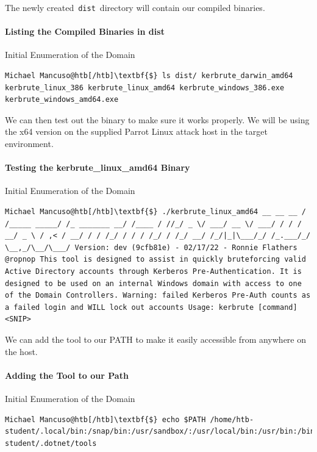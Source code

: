 The newly created \verb|dist| directory will contain our compiled binaries.

\paragraph{Listing the Compiled Binaries in dist}

Initial Enumeration of the Domain

\begin{verbatim}
Michael Mancuso@htb[/htb]\textbf{$} ls dist/ kerbrute_darwin_amd64 kerbrute_linux_386 kerbrute_linux_amd64 kerbrute_windows_386.exe kerbrute_windows_amd64.exe 
\end{verbatim}

We can then test out the binary to make sure it works properly. We will be using the x64 version on the supplied Parrot Linux attack host in the target environment.

\paragraph{Testing the kerbrute\_linux\_amd64 Binary}

Initial Enumeration of the Domain

\begin{verbatim}
Michael Mancuso@htb[/htb]\textbf{$} ./kerbrute_linux_amd64 __ __ __ / /_____ _____/ /_ _______ __/ /____ / //_/ _ \/ ___/ __ \/ ___/ / / / __/ _ \ / ,< / __/ / / /_/ / / / /_/ / /_/ __/ /_/|_|\___/_/ /_.___/_/ \__,_/\__/\___/ Version: dev (9cfb81e) - 02/17/22 - Ronnie Flathers @ropnop This tool is designed to assist in quickly bruteforcing valid Active Directory accounts through Kerberos Pre-Authentication. It is designed to be used on an internal Windows domain with access to one of the Domain Controllers. Warning: failed Kerberos Pre-Auth counts as a failed login and WILL lock out accounts Usage: kerbrute [command] <SNIP> 
\end{verbatim}

We can add the tool to our PATH to make it easily accessible from anywhere on the host.

\paragraph{Adding the Tool to our Path}

Initial Enumeration of the Domain

\begin{verbatim}
Michael Mancuso@htb[/htb]\textbf{$} echo $PATH /home/htb-student/.local/bin:/snap/bin:/usr/sandbox/:/usr/local/bin:/usr/bin:/bin:/usr/local/games:/usr/games:/usr/share/games:/usr/local/sbin:/usr/sbin:/sbin:/snap/bin:/usr/local/sbin:/usr/sbin:/sbin:/usr/local/bin:/usr/bin:/bin:/usr/local/games:/usr/games:/home/htb-student/.dotnet/tools 
\end{verbatim}


